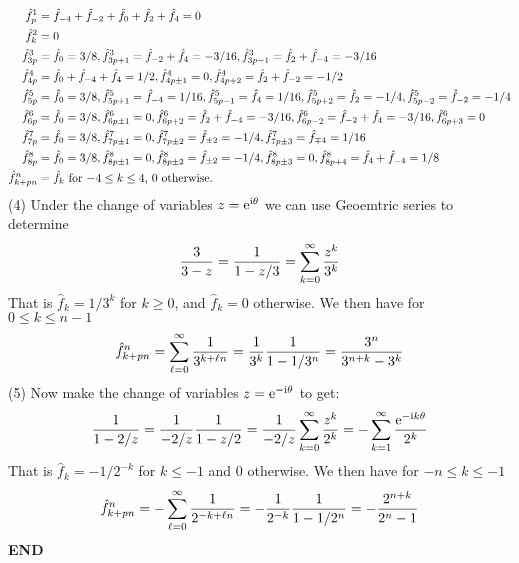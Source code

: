 \documentclass[12pt,a4paper]{article}
\begin{document}
\begin{align*}
\hat f_p^1 &=\hat f_{-4} + \hat f_{-2} + \hat f_0 + \hat f_2 +  \hat f_4 = 0 \\
\hat f_k^2 &= 0 \\
\hat f_{3p}^3 &= \hat f_0 = 3/8, \hat f_{3p+1}^3 = \hat f_{-2} + \hat f_4 =-3/16,  \hat f_{3p-1}^3 = \hat f_{2} + \hat f_{-4} =-3/16 \\
\hat f_{4p}^4 &= \hat f_0 + \hat f_{-4} + \hat f_4 = 1/2, \hat f_{4p\ensuremath{\pm}1}^4 = 0,  \hat f_{4p+2}^4 = \hat f_{2} + \hat f_{-2} =-1/2 \\
\hat f_{5p}^5 &= \hat f_0 = 3/8, \hat f_{5p+1}^5 = \hat f_{-4} = 1/16, \hat f_{5p-1}^5 = \hat f_{4} = 1/16,  \hat f_{5p+2}^5 = \hat f_2 = -1/4, \hat f_{5p-2}^5 = \hat f_{-2} = -1/4  \\
\hat f_{6p}^6 &= \hat f_0 = 3/8, \hat f_{6p\ensuremath{\pm}1}^6 = 0,  \hat f_{6p+2}^6 = \hat f_2 + \hat f_{-4} = -3/16,  \hat f_{6p-2}^6 = \hat f_{-2} + \hat f_{4} = -3/16, \hat f_{6p+3}^6 =0  \\
\hat f_{7p}^7 &= \hat f_0 = 3/8, \hat f_{7p\ensuremath{\pm}1}^7 = 0,  \hat f_{7p\ensuremath{\pm}2}^7 = \hat f_{\ensuremath{\pm}2} = -1/4, \hat f_{7p\ensuremath{\pm}3}^7 = \hat f_{\ensuremath{\mp}4} = 1/16 \\
\hat f_{8p}^8 &= \hat f_0 = 3/8, \hat f_{8p\ensuremath{\pm}1}^8 = 0,  \hat f_{8p\ensuremath{\pm}2}^8 = \hat f_{\ensuremath{\pm}2} = -1/4, \hat f_{8p\ensuremath{\pm}3}^8 = 0, \hat f_{8p+4}^8 = \hat f_4 + \hat f_{-4} = 1/8 \\
\hat f_{k+pn}^n &= \hat f_k \hbox{ for $-4 \ensuremath{\leq} k \ensuremath{\leq} 4$, 0 otherwise}.
\end{align*}
(4) Under the change of variables $z = {\rm e}^{{\rm i}\ensuremath{\theta}}$ we can use Geoemtric series to determine
\[
{3 \over 3 - z} = {1 \over 1- z/3} = \ensuremath{\sum}_{k=0}^\ensuremath{\infty} {z^k \over 3^k}
\]
That is $\hat f_k = 1/3^k$ for $k \ensuremath{\geq} 0$, and $\hat f_k = 0$ otherwise. We then have for $0 \ensuremath{\leq} k \ensuremath{\leq} n-1$
\[
\hat f_{k+pn}^n = \ensuremath{\sum}_{\ensuremath{\ell}=0}^\ensuremath{\infty} {1 \over 3^{k+\ensuremath{\ell}n}} = {1 \over 3^k} {1 \over 1 - 1/3^n} = {3^n \over 3^{n+k} - 3^k}
\]
(5) Now make the change of variables $z = {\rm e}^{-{\rm i} \ensuremath{\theta}}$ to get:
\[
{1 \over 1 - 2/z} = {1 \over -2/z} {1 \over 1 - z/2} = {1 \over -2/z} \ensuremath{\sum}_{k=0}^\ensuremath{\infty} {z^k \over 2^k}
= - \ensuremath{\sum}_{k=1}^\ensuremath{\infty} {{\rm e}^{-{\rm i} k \ensuremath{\theta}} \over 2^k}
\]
That is $\hat f_k = -1/2^{-k}$ for $k \ensuremath{\leq} -1$ and 0 otherwise. We then have for $-n \ensuremath{\leq} k \ensuremath{\leq} -1$
\[
\hat f_{k+pn}^n =- \ensuremath{\sum}_{\ensuremath{\ell}=0}^\ensuremath{\infty} {1 \over 2^{-k+\ensuremath{\ell}n}} = -{1 \over 2^{-k}} {1 \over 1 - 1/2^n} = -{2^{n+k} \over 2^n - 1}
\]
\textbf{END}
\end{document}
